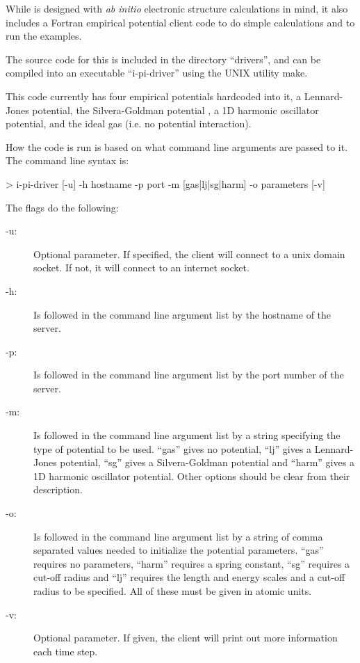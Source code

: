 \documentclass[11pt,english,fleqn]{report}
\newenvironment{code}{%
\footnotesize 
\verbatim
}{
\endverbatim
\normalsize
}
\begin{document}
While \ipi is designed with \emph{ab initio} electronic structure calculations
in mind, it also includes a Fortran empirical potential client code to do 
simple calculations and to run the examples.

The source code for this is included in the directory {}``drivers'', and can
be compiled into an executable {}``i-pi-driver'' using the UNIX utility make.

This code currently has four empirical potentials hardcoded into it, 
a Lennard-Jones potential, the Silvera-Goldman potential \cite{silv-gold78jcp},
a 1D harmonic oscillator potential, and the ideal gas (i.e. no potential
interaction).

How the code is run is based on what command line arguments are passed to it.
The command line syntax is:

\begin{code}
> i-pi-driver [-u] -h hostname -p port -m [gas|lj|sg|harm] -o parameters [-v]
\end{code}

The flags do the following:

\begin{description}
\item[-u:] Optional parameter. If specified, the client will connect to
a unix domain socket. If not, it will connect to an internet socket.
\item[-h:] Is followed in the command line argument list by the hostname
of the server.
\item[-p:] Is followed in the command line argument list by the port number
of the server.
\item[-m:] Is followed in the command line argument list by a string
specifying the type of potential to be used. {}``gas'' gives no potential,
{}``lj'' gives a Lennard-Jones potential, {}``sg'' gives a Silvera-Goldman
potential and {}``harm'' gives a 1D harmonic oscillator potential. Other options
should be clear from their description.
\item[-o:] Is followed in the command line argument list by a string of
comma separated values needed to initialize the potential parameters.
{}``gas'' requires no parameters, {}``harm'' requires a spring constant,
{}``sg'' requires a cut-off radius and {}``lj'' requires the length and
energy scales and a cut-off radius to be specified. All of these must
be given in atomic units. 
\item[-v:] Optional parameter. If given, the client will print out
more information each time step.
\end{description}
\end{document}
